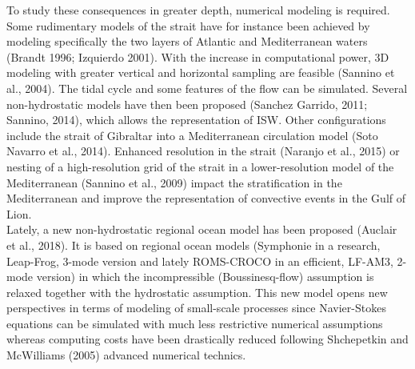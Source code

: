 To study these consequences in greater depth, numerical modeling is required. Some rudimentary models of the strait have for instance been achieved by modeling specifically the two layers of Atlantic and Mediterranean waters (Brandt 1996; Izquierdo 2001). With the increase in computational power, 3D modeling with greater vertical and horizontal sampling are feasible (Sannino et al., 2004). The tidal cycle and some features of the flow can be simulated. Several non-hydrostatic models have then been proposed (Sanchez Garrido, 2011; Sannino, 2014), which allows the representation of ISW. Other configurations include the strait of Gibraltar into a Mediterranean circulation model (Soto Navarro et al., 2014). Enhanced resolution in the strait (Naranjo et al., 2015) or nesting of a high-resolution grid of the strait in a lower-resolution model of the Mediterranean (Sannino et al., 2009) impact the stratification in the Mediterranean and improve the representation of convective events in the Gulf of Lion.\\
Lately, a new non-hydrostatic regional ocean model has been proposed (Auclair et al., 2018). It is based on regional ocean models (Symphonie in a research, Leap-Frog, 3-mode version and lately ROMS-CROCO in an efficient, LF-AM3, 2-mode version) in which the incompressible (Boussinesq-flow) assumption is relaxed together with the hydrostatic assumption. This new model opens new perspectives in terms of modeling of small-scale processes since Navier-Stokes equations can be simulated with much less restrictive numerical assumptions whereas computing costs have been drastically reduced following Shchepetkin and McWilliams (2005) advanced numerical technics.\\


